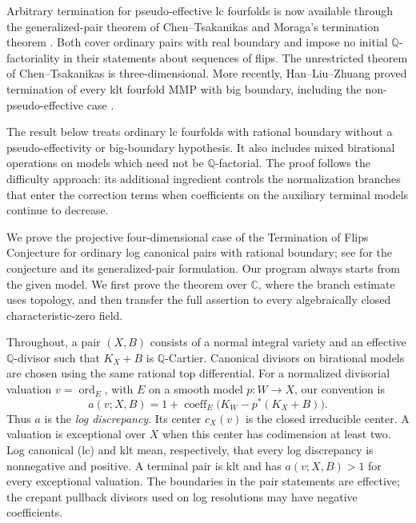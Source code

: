 Arbitrary termination for pseudo-effective lc fourfolds is now
available through the generalized-pair theorem of
Chen--Tsakanikas \cite[Theorem~1.1]{ChenTsakanikas} and Moraga's
termination theorem \cite[Theorem~1]{Moraga2025}. Both cover
ordinary pairs with real boundary and impose no initial
$\mathbb Q$-factoriality in their statements about sequences of
flips. The unrestricted theorem of Chen--Tsakanikas is
three-dimensional. More recently, Han--Liu--Zhuang proved
termination of every klt fourfold MMP with big boundary, including
the non-pseudo-effective case
\cite[Corollary~3.2(3)]{HanLiuZhuang2025}.

The result below treats ordinary lc fourfolds with rational
boundary without a pseudo-effectivity or big-boundary hypothesis.
It also includes mixed birational operations on models which
need not be $\mathbb Q$-factorial. The proof follows the difficulty
approach: its additional ingredient controls the normalization
branches that enter the correction terms when coefficients on
the auxiliary terminal models continue to decrease.

We prove the projective four-dimensional case of the Termination of Flips
Conjecture for ordinary log canonical pairs with rational boundary;
see \cite[Introduction]{ChenTsakanikas} for the conjecture and its
generalized-pair formulation. Our program always starts from the given
model. We first prove the theorem over $\mathbb C$, where the branch
estimate uses topology, and then transfer the full assertion to every
algebraically closed characteristic-zero field.

Throughout, a pair $(X,B)$ consists of a normal integral variety and an effective $\mathbb Q$-divisor such that $K_X+B$ is $\mathbb Q$-Cartier. Canonical divisors on birational models are chosen using the same rational top differential. For a normalized divisorial valuation $v=\operatorname{ord}_E$, with $E$ on a smooth model $p:W\to X$, our convention is
\[
 a(v;X,B)=1+\operatorname{coeff}_E\bigl(K_W-p^*(K_X+B)\bigr).
\]
Thus $a$ is the \emph{log discrepancy}. Its center $c_X(v)$ is the closed irreducible center. A valuation is exceptional over $X$ when this center has codimension at least two. Log canonical (lc) and klt mean, respectively, that every log discrepancy is nonnegative and positive. A terminal pair is klt and has $a(v;X,B)>1$ for every exceptional valuation. The boundaries in the pair statements are effective; the crepant pullback divisors used on log resolutions may have negative coefficients.

